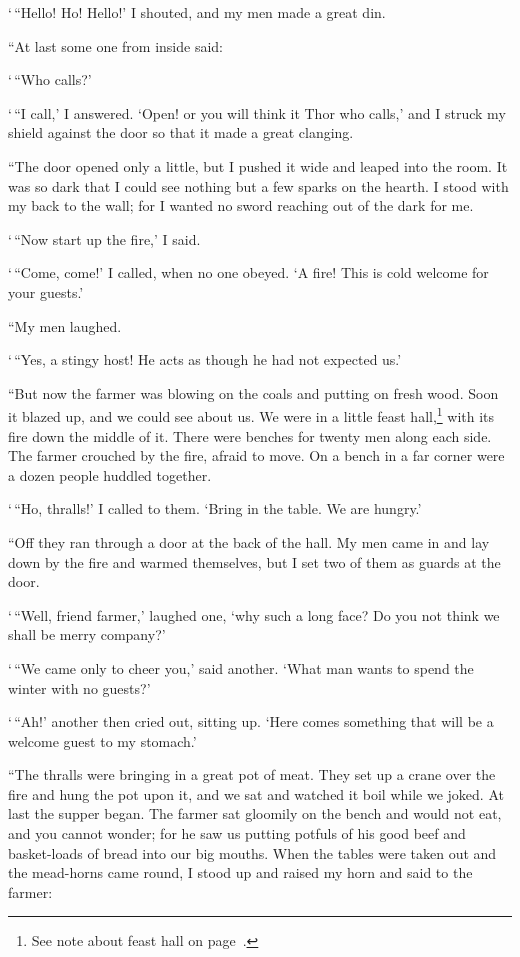 `\,``Hello! Ho! Hello!' I shouted, and my men made a great din.

``At last some one from inside said:

`\,``Who calls?'

`\,``I call,' I answered. `Open! or you will think it Thor who calls,' and
I struck my shield against the door so that it made a great clanging.

``The door opened only a little, but I pushed it wide and leaped into the
room. It was so dark that I could see nothing but a few sparks on the
hearth. I stood with my back to the wall; for I wanted no sword reaching
out of the dark for me.

`\,``Now start up the fire,' I said.

`\,``Come, come!' I called, when no one obeyed. `A fire! This is cold
welcome for your guests.'

``My men laughed.

`\,``Yes, a stingy host! He acts as though he had not expected us.'

``But now the farmer was blowing on the coals and putting on fresh wood.
Soon it blazed up, and we could see about us. We were in a little feast
hall,\footnote{See note about feast hall on page~\pageref{feast-hall}.}
with its fire down the middle of it. There were benches for twenty men
along each side. The farmer crouched by the fire, afraid to move. On a
bench in a far corner were a dozen people huddled together.

`\,``Ho, thralls!' I called to them. `Bring in the table. We are hungry.'

``Off they ran through a door at the back of the hall. My men came in and
lay down by the fire and warmed themselves, but I set two of them as
guards at the door.

`\,``Well, friend farmer,' laughed one, `why such a long face? Do you not
think we shall be merry company?'

`\,``We came only to cheer you,' said another. `What man wants to spend the
winter with no guests?'

`\,``Ah!' another then cried out, sitting up. `Here comes something that
will be a welcome guest to my stomach.'

``The thralls were bringing in a great pot of meat. They set up a crane
over the fire and hung the pot upon it, and we sat and watched it boil
while we joked. At last the supper began. The farmer sat gloomily on the
bench and would not eat, and you cannot wonder; for he saw us putting
potfuls of his good beef and basket-loads of bread into our big mouths.
When the tables were taken out and the mead-horns came round, I stood up
and raised my horn and said to the farmer:

